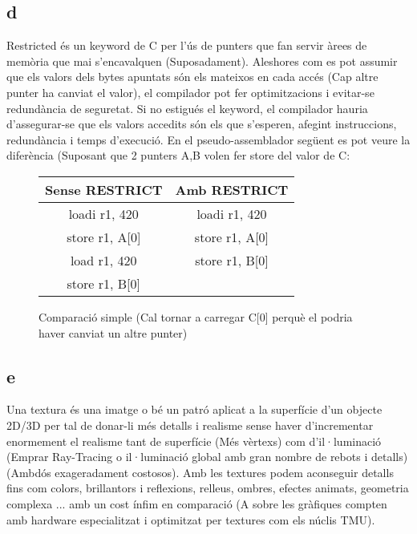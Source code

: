 \documentclass[12pt]{article}
\begin{document}
\subsection{d}

Restricted és un keyword de C per l'ús de punters que fan servir àrees de memòria que mai s'encavalquen (Suposadament). Aleshores com es pot assumir que els valors dels bytes apuntats són els mateixos en cada accés (Cap altre punter ha canviat el valor), el compilador pot fer optimitzacions i evitar-se redundància de seguretat. Si no estigués el keyword, el compilador hauria d'assegurar-se que els valors accedits són els que s'esperen, afegint instruccions, redundància i temps d'execució. En el pseudo-assemblador següent es pot veure la diferència (Suposant que 2 punters A,B volen fer store del valor de C\cite{cpp_reference_restrict}:

\begin{figure}[h]
    \centering
    \begin{tabular}{cc}
        \hline
        Sense RESTRICT & Amb RESTRICT \\
        \hline
        loadi r1, 420 & loadi r1, 420\\
        store r1, A[0] & store r1, A[0] \\
        load r1, 420 & store r1, B[0] \\
        store r1, B[0] & \\
        \hline
    \end{tabular}
    \caption{Comparació simple (Cal tornar a carregar C[0] perquè el podria haver canviat un altre punter)}
    \label{tab:mytable}
\end{figure}

\subsection{e}

Una textura és una imatge o bé un patró aplicat a la superfície d'un objecte 2D/3D per tal de donar-li més detalls i realisme sense haver d'incrementar enormement el realisme tant de superfície (Més vèrtexs) com d'il·luminació (Emprar Ray-Tracing o il·luminació global amb gran nombre de rebots i detalls) (Ambdós exageradament costosos). Amb les textures podem aconseguir detalls fins com colors, brillantors i reflexions, relleus, ombres, efectes animats, geometria complexa ... amb un cost ínfim en comparació (A sobre les gràfiques compten amb hardware especialitzat i optimitzat per textures com els núclis TMU).\cite{graphics_cards_slides}
\end{document}
